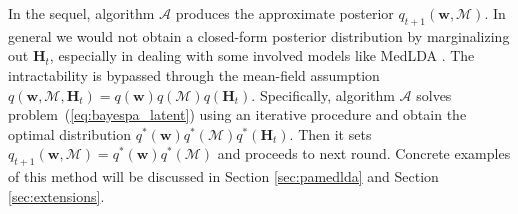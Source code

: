 \documentclass[twoside,11pt]{article}
\newcommand{\Hv}{\bm{H}}
\newcommand{\algo}{\mathcal{A}}
\newcommand{\wv}{\bm{w}}
\newcommand{\Mv}{\bm{\mathcal{M}}}
\begin{document}
In the sequel, algorithm $\algo$ produces the approximate posterior $q_{t+1}(\wv, \Mv)$. In general we would not obtain a closed-form posterior distribution by marginalizing out $\Hv_t$, especially in dealing with some involved models like MedLDA \citep{zhu2012medlda}. The intractability is bypassed through the mean-field assumption $q(\wv, \Mv, \Hv_t) = q(\wv) q(\Mv) q(\Hv_t)$. Specifically, algorithm $\algo$ solves problem~(\ref{eq:bayespa_latent}) using an iterative procedure and obtain the optimal distribution $q^*(\wv) q^*(\Mv) q^*(\Hv_t)$. Then it sets $q_{t+1}(\wv, \Mv) = q^*(\wv) q^*(\Mv)$ and proceeds to next round. Concrete examples of this method will be discussed in Section \ref{sec:pamedlda} and Section \ref{sec:extensions}.

\end{document}

